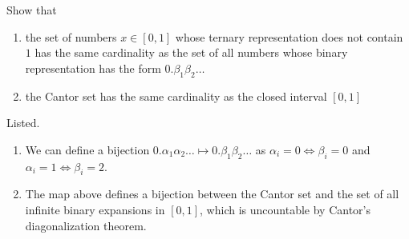   \begin{exercise}[Zorich 2.4.8]
    Show that 
    \begin{enumerate}
      \item the set of numbers $x \in [0, 1]$ whose ternary representation does not contain $1$ has the same cardinality as the set of all numbers whose binary representation has the form $0.\beta_1 \beta_2 \ldots$ 
      \item the Cantor set has the same cardinality as the closed interval $[0, 1]$ 
    \end{enumerate}
  \end{exercise}
  \begin{solution}
    Listed. 
    \begin{enumerate}
      \item We can define a bijection $0.\alpha_1 \alpha_2 \ldots \mapsto 0.\beta_1 \beta_2 \ldots$ as $\alpha_i = 0 \iff \beta_i = 0$ and $\alpha_i = 1 \iff \beta_i = 2$. 
      \item The map above defines a bijection between the Cantor set and the set of all infinite binary expansions in $[0, 1]$, which is uncountable by Cantor's diagonalization theorem. 
    \end{enumerate}
  \end{solution}

